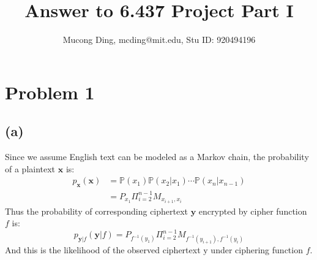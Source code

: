 \documentclass[12pt]{article}
\begin{document}
\title{Answer to 6.437 Project Part I}

\author{Mucong Ding, mcding@mit.edu, Stu ID: 920494196}

\maketitle

\section{Problem 1}
\subsection{(a)}
Since we assume English text can be modeled as a Markov chain, the probability of a plaintext $\mathbf{x}$ is:
\begin{equation}
\begin{split}
	p_{\mathbf{x}}(\mathbf{x}) & = \mathbb{P}(x_1)\mathbb{P}(x_2|x_1)\cdots\mathbb{P}(x_n|x_{n-1})\\ 
	& = P_{x_1}\Pi_{i=2}^{n-1}M_{x_{i+1},x_i}
\end{split}
\end{equation}
Thus the probability of corresponding ciphertext $\mathbf{y}$ encrypted by cipher function $f$ is:
\begin{equation}
\label{likelihood}
	p_{\mathbf{y}|f}(\mathbf{y}|f) = P_{f^{-1}(y_1)}\Pi_{i=2}^{n-1}M_{f^{-1}(y_{i+1}),f^{-1}(y_i)}
\end{equation}
And this is the likelihood of the observed ciphertext $\mathrm{y}$ under ciphering function $f$.
\end{document}
